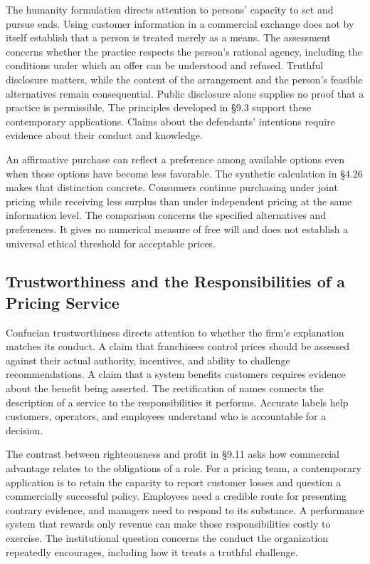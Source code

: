 The humanity formulation directs attention to persons' capacity to set
and pursue ends. Using customer information in a commercial exchange
does not by itself establish that a person is treated merely as a means.
The assessment concerns whether the practice respects the person's
rational agency, including the conditions under which an offer can be
understood and refused. Truthful disclosure matters, while the content
of the arrangement and the person's feasible alternatives remain
consequential. Public disclosure alone supplies no proof that a practice
is permissible. The principles developed in §9.3 support these
contemporary applications. Claims about the defendants' intentions
require evidence about their conduct and knowledge.

An affirmative purchase can reflect a preference among available options
even when those options have become less favorable. The synthetic
calculation in §4.26 makes that distinction concrete. Consumers continue
purchasing under joint pricing while receiving less surplus than under
independent pricing at the same information level. The comparison
concerns the specified alternatives and preferences. It gives no
numerical measure of free will and does not establish a universal
ethical threshold for acceptable prices.

\hypertarget{M09-trustworthiness-and-the-responsibilities-of-a-pricing-service}{%
\subsection{Trustworthiness and the Responsibilities of a Pricing
Service}\label{M09-trustworthiness-and-the-responsibilities-of-a-pricing-service}}

\noindent \noindent Confucian trustworthiness directs attention to whether the
firm's explanation matches its conduct. A claim that franchisees control
prices should be assessed against their actual authority, incentives,
and ability to challenge recommendations. A claim that a system benefits
customers requires evidence about the benefit being asserted. The
rectification of names connects the description of a service to the
responsibilities it performs. Accurate labels help customers, operators,
and employees understand who is accountable for a decision.

The contrast between righteousness and profit in §9.11 asks how
commercial advantage relates to the obligations of a role. For a pricing
team, a contemporary application is to retain the capacity to report
customer losses and question a commercially successful policy. Employees
need a credible route for presenting contrary evidence, and managers
need to respond to its substance. A performance system that rewards only
revenue can make those responsibilities costly to exercise. The
institutional question concerns the conduct the organization repeatedly
encourages, including how it treats a truthful challenge.

